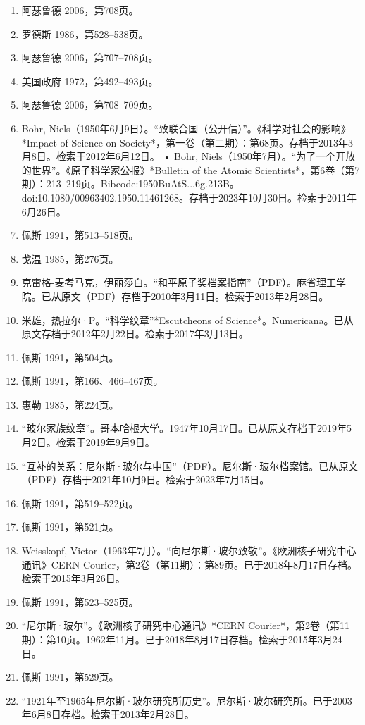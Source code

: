 \begin{enumerate}
\item 阿瑟鲁德 2006，第708页。
\item 罗德斯 1986，第528–538页。
\item 阿瑟鲁德 2006，第707–708页。
\item 美国政府 1972，第492–493页。
\item 阿瑟鲁德 2006，第708–709页。
\item Bohr, Niels（1950年6月9日）。“致联合国（公开信）”。《科学对社会的影响》*Impact of Science on Society*，第一卷（第二期）：第68页。存档于2013年3月8日。检索于2012年6月12日。
• Bohr, Niels（1950年7月）。“为了一个开放的世界”。《原子科学家公报》*Bulletin of the Atomic Scientists*，第6卷（第7期）：213–219页。Bibcode:1950BuAtS...6g.213B。doi:10.1080/00963402.1950.11461268。存档于2023年10月30日。检索于2011年6月26日。
\item 佩斯 1991，第513–518页。
\item 戈温 1985，第276页。
\item 克雷格-麦考马克，伊丽莎白。“和平原子奖档案指南”（PDF）。麻省理工学院。已从原文（PDF）存档于2010年3月11日。检索于2013年2月28日。
\item 米雄，热拉尔·P。“科学纹章”*Escutcheons of Science*。Numericana。已从原文存档于2012年2月22日。检索于2017年3月13日。
\item 佩斯 1991，第504页。
\item 佩斯 1991，第166、466–467页。
\item 惠勒 1985，第224页。
\item “玻尔家族纹章”。哥本哈根大学。1947年10月17日。已从原文存档于2019年5月2日。检索于2019年9月9日。
\item “互补的关系：尼尔斯·玻尔与中国\*”（PDF）。尼尔斯·玻尔档案馆。已从原文（PDF）存档于2021年10月9日。检索于2023年7月15日。
\item 佩斯 1991，第519–522页。
\item 佩斯 1991，第521页。
\item Weisskopf, Victor（1963年7月）。“向尼尔斯·玻尔致敬”。《欧洲核子研究中心通讯》CERN Courier，第2卷（第11期）：第89页。已于2018年8月17日存档。检索于2015年3月26日。
\item 佩斯 1991，第523–525页。
\item “尼尔斯·玻尔”。《欧洲核子研究中心通讯》*CERN Courier*，第2卷（第11期）：第10页。1962年11月。已于2018年8月17日存档。检索于2015年3月24日。
\item 佩斯 1991，第529页。
\item “1921年至1965年尼尔斯·玻尔研究所历史”。尼尔斯·玻尔研究所。已于2003年6月8日存档。检索于2013年2月28日。

\end{enumerate}
